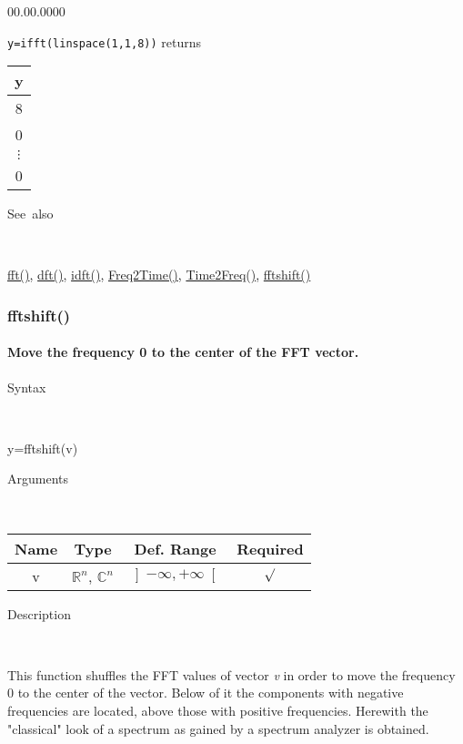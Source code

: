 \begin{lyxlist}{00.00.0000}
\item [\texttt{y=ifft(linspace(1,1,8))}]returns \begin{tabular}{|c|}
\hline 
y\tabularnewline
\hline
\hline 
8\tabularnewline
\hline 
0\tabularnewline
\hline 
$\vdots$\tabularnewline
\hline 
0\tabularnewline
\hline
\end{tabular}
\end{lyxlist}
\begin{description}
\item [See~also]~
\end{description}
\textcolor{blue}{\hyperlink{fft}{fft()}}\textcolor{black}{,} \textcolor{blue}{\hyperlink{dft}{dft()}}\textcolor{black}{,}
\textcolor{blue}{\hyperlink{idft}{idft()}}\textcolor{black}{,}
\textcolor{blue}{\hyperlink{Freq2Time}{Freq2Time()}}\textcolor{black}{,}
\textcolor{blue}{\hyperlink{Time2Freq}{Time2Freq()}}\textcolor{black}{,}
\textcolor{blue}{\hyperlink{fftshift}{fftshift()}}



\newpage
\subsubsection*{\hypertarget{fftshift}{}{\Large fftshift()}}


\paragraph{\label{par:fftshift}Move the frequency 0 to the center of the FFT vector.}

\begin{description}
\item [Syntax]~
\end{description}
y=fftshift(v)

\begin{description}
\item [Arguments]~
\end{description}
\begin{tabular}{|c|c|c|c|}
\hline 
Name&
Type&
Def. Range&
Required\tabularnewline
\hline
\hline 
v&
$\mathbb{R}^{n}$, $\mathbb{C}^{n}$&
$\left]-\infty,+\infty\right[$&
$\surd$\tabularnewline
\hline 
\end{tabular}

\begin{description}
\item [Description]~
\end{description}
This function shuffles the FFT values of vector \textit{v} in order to move the frequency 0 to the center of the vector.
Below of it the components with negative frequencies are located, above those with positive frequencies.
Herewith the "classical" look of a spectrum as gained by a spectrum analyzer is obtained.

